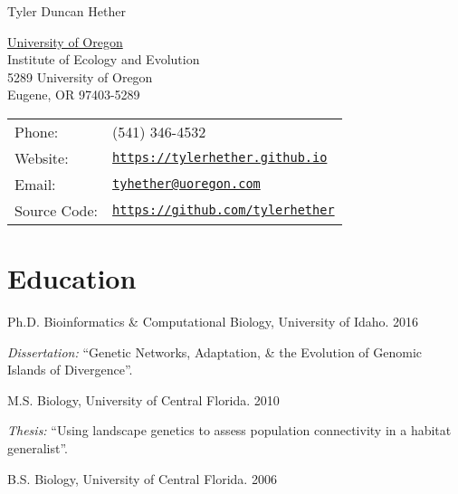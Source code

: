 \documentclass[letterpaper]{article}
\def\name{Tyler Duncan Hether}
\renewenvironment{itemize}{
  \begin{list}{}{
    \setlength{\leftmargin}{1.5em}
  }
}{
  \end{list}
}
\begin{document}
{\huge \name}


\vspace{0.25in}

\begin{minipage}{0.45\linewidth}
  \href{http://uoregon.edu/}{University of Oregon} \\
  Institute of Ecology and Evolution \\
  5289 University of Oregon \\
  Eugene, OR 97403-5289
\end{minipage}
\begin{minipage}{0.45\linewidth}
  \begin{tabular}{ll}
    Phone: & (541) 346-4532 \\
    Website: & \href{https://tylerhether.github.io}{\tt https://tylerhether.github.io} \\
    Email: & \href{mailto:tyhether@uoregon.com}{\tt tyhether@uoregon.com} \\
    Source Code: & \href{https://github.com/tylerhether}{\tt https://github.com/tylerhether} \\
  \end{tabular}
\end{minipage}





\section*{Education}

\begin{itemize}
  \item Ph.D. Bioinformatics \& Computational Biology, University of Idaho. 2016
    \begin{itemize}
    \item \emph{Dissertation:} ``Genetic Networks, Adaptation,
  \& the Evolution of Genomic Islands of Divergence''.
    \end{itemize}
  \item M.S. Biology, University of Central Florida.
    2010
    \begin{itemize}
    \item \emph{Thesis:} ``Using landscape genetics to assess population connectivity in a habitat generalist''.
    \end{itemize}
  \item B.S. Biology, University of Central Florida.
    2006
\end{itemize}
\end{document}
